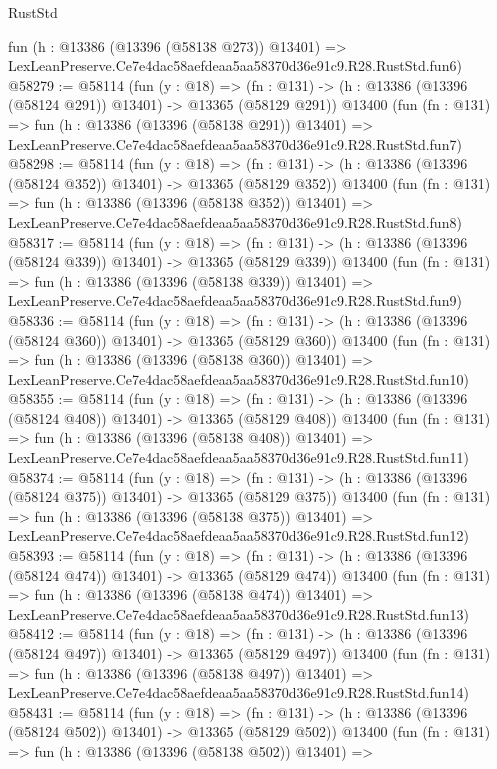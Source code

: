 \begin{lexlean}{RustStd}
\begin{coremodule}
    fun (h : @13386 (@13396 (@58138 @273)) @13401) =>
    LexLeanPreserve.Ce7e4dac58aefdeaa5aa58370d36e91c9.R28.RustStd.fun6)
@58279 := @58114
    (fun (y : @18) =>
    (fn : @131) -> (h : @13386 (@13396 (@58124 @291)) @13401) -> @13365 (@58129 @291))
    @13400
    (fun (fn : @131) =>
    fun (h : @13386 (@13396 (@58138 @291)) @13401) =>
    LexLeanPreserve.Ce7e4dac58aefdeaa5aa58370d36e91c9.R28.RustStd.fun7)
@58298 := @58114
    (fun (y : @18) =>
    (fn : @131) -> (h : @13386 (@13396 (@58124 @352)) @13401) -> @13365 (@58129 @352))
    @13400
    (fun (fn : @131) =>
    fun (h : @13386 (@13396 (@58138 @352)) @13401) =>
    LexLeanPreserve.Ce7e4dac58aefdeaa5aa58370d36e91c9.R28.RustStd.fun8)
@58317 := @58114
    (fun (y : @18) =>
    (fn : @131) -> (h : @13386 (@13396 (@58124 @339)) @13401) -> @13365 (@58129 @339))
    @13400
    (fun (fn : @131) =>
    fun (h : @13386 (@13396 (@58138 @339)) @13401) =>
    LexLeanPreserve.Ce7e4dac58aefdeaa5aa58370d36e91c9.R28.RustStd.fun9)
@58336 := @58114
    (fun (y : @18) =>
    (fn : @131) -> (h : @13386 (@13396 (@58124 @360)) @13401) -> @13365 (@58129 @360))
    @13400
    (fun (fn : @131) =>
    fun (h : @13386 (@13396 (@58138 @360)) @13401) =>
    LexLeanPreserve.Ce7e4dac58aefdeaa5aa58370d36e91c9.R28.RustStd.fun10)
@58355 := @58114
    (fun (y : @18) =>
    (fn : @131) -> (h : @13386 (@13396 (@58124 @408)) @13401) -> @13365 (@58129 @408))
    @13400
    (fun (fn : @131) =>
    fun (h : @13386 (@13396 (@58138 @408)) @13401) =>
    LexLeanPreserve.Ce7e4dac58aefdeaa5aa58370d36e91c9.R28.RustStd.fun11)
@58374 := @58114
    (fun (y : @18) =>
    (fn : @131) -> (h : @13386 (@13396 (@58124 @375)) @13401) -> @13365 (@58129 @375))
    @13400
    (fun (fn : @131) =>
    fun (h : @13386 (@13396 (@58138 @375)) @13401) =>
    LexLeanPreserve.Ce7e4dac58aefdeaa5aa58370d36e91c9.R28.RustStd.fun12)
@58393 := @58114
    (fun (y : @18) =>
    (fn : @131) -> (h : @13386 (@13396 (@58124 @474)) @13401) -> @13365 (@58129 @474))
    @13400
    (fun (fn : @131) =>
    fun (h : @13386 (@13396 (@58138 @474)) @13401) =>
    LexLeanPreserve.Ce7e4dac58aefdeaa5aa58370d36e91c9.R28.RustStd.fun13)
@58412 := @58114
    (fun (y : @18) =>
    (fn : @131) -> (h : @13386 (@13396 (@58124 @497)) @13401) -> @13365 (@58129 @497))
    @13400
    (fun (fn : @131) =>
    fun (h : @13386 (@13396 (@58138 @497)) @13401) =>
    LexLeanPreserve.Ce7e4dac58aefdeaa5aa58370d36e91c9.R28.RustStd.fun14)
@58431 := @58114
    (fun (y : @18) =>
    (fn : @131) -> (h : @13386 (@13396 (@58124 @502)) @13401) -> @13365 (@58129 @502))
    @13400
    (fun (fn : @131) =>
    fun (h : @13386 (@13396 (@58138 @502)) @13401) =>

\end{coremodule}
\end{lexlean}
